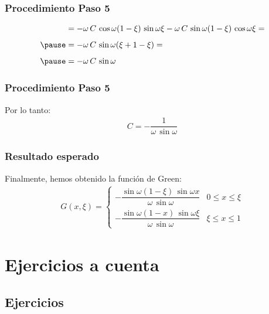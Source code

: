 \documentclass[12pt]{beamer}
\begin{document}
\begin{frame}
\frametitle{Procedimiento Paso 5}
\begin{eqnarray}
\begin{aligned}[b]
&= - \omega \, C \, \cos \omega (1 - \xi) \, \sin \omega \xi - \omega \, C \, \sin \omega (1 - \xi) \, \cos \omega  \xi = \\[0.5em] \pause
&= - \omega \, C \, \sin \omega (\xi + 1 - \xi) = \\[0.5em] \pause
&= - \omega \, C \, \sin \omega
\end{aligned}
\label{eq:ecuacion_07_39}
\end{eqnarray}
\end{frame}
\begin{frame}
\frametitle{Procedimiento Paso 5}
Por lo tanto:
\pause
\begin{align*}
C = - \dfrac{1}{\omega \, \sin \omega}
\end{align*}
\end{frame}
\begin{frame}
\frametitle{Resultado esperado}
Finalmente, hemos obtenido la función de Green:
\pause
\begin{align}
G (x, \xi) = \begin{cases}
- \dfrac{\sin \omega (1 - \xi) \, \sin \omega x}{\omega \, \sin \omega} & 0 \leq x \leq \xi \\[1em]
- \dfrac{\sin \omega (1 - x) \, \sin \omega \xi}{\omega \, \sin \omega} & \xi \leq x \leq 1
\end{cases}
\label{eq:ecuacion_07_40}
\end{align}
\end{frame}

\section{Ejercicios a cuenta}
\subsection{Ejercicios}
\end{document}
